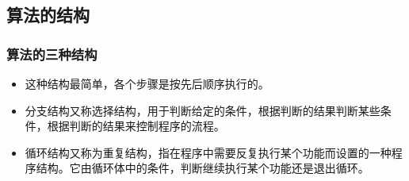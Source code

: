 \subsection{算法的结构}


\begin{frame}
    \frametitle{算法的三种结构}
    \begin{itemize}
      \item {}
      
      这种结构最简单，各个步骤是按先后顺序执行的。
      
      \item {}
      
      分支结构又称选择结构，用于判断给定的条件，根据判断的结果判断某些条件，根据判断的结果来控制程序的流程。
      
      \item {}
      
      循环结构又称为重复结构，指在程序中需要反复执行某个功能而设置的一种程序结构。它由循环体中的条件，判断继续执行某个功能还是退出循环。
       
    \end{itemize}
\end{frame}

